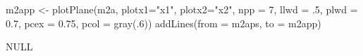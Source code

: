 \begin{Schunk}
\begin{Sinput}
 m2app <- plotPlane(m2a, plotx1="x1", plotx2="x2", npp = 7, llwd = .5, plwd = 0.7, pcex = 0.75, pcol = gray(.6))
 addLines(from = m2aps, to = m2app)
\end{Sinput}
\begin{Soutput}
NULL
\end{Soutput}
\end{Schunk}
